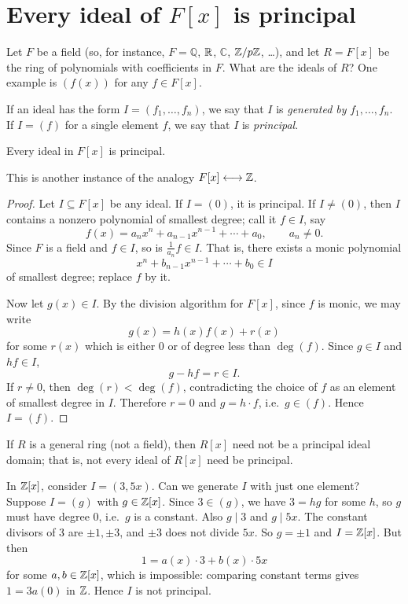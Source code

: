 \documentclass[reqno,11pt]{amsart}
\newcommand{\Q}{\mathbb{Q}}
\newcommand{\C}{\mathbb{C}}
\begin{document}
\section{Every ideal of \texorpdfstring{$F[x]$}{F[x]} is principal}

Let $F$ be a field (so, for instance, $F=\Q$, $\mathbb{R}$, $\C$,
$\mathbb{Z}/p\mathbb{Z}$, \dots), and let $R=F[x]$ be the ring of polynomials with
coefficients in $F$. What are the ideals of $R$? One example is
$(f(x))$ for any $f\in F[x]$.

\begin{define}
If an ideal has the form $I=(f_1,\dots,f_n)$, we say that $I$ is
\emph{generated by} $f_1,\dots,f_n$. If $I=(f)$ for a single element
$f$, we say that $I$ is \emph{principal}.
\end{define}

\begin{theorem}\label{thm:Fx-principal}
Every ideal in $F[x]$ is principal.
\end{theorem}

This is another instance of the analogy $F[x]\longleftrightarrow\mathbb{Z}$.

\begin{proof}
Let $I\subseteq F[x]$ be any ideal. If $I=(0)$, it is principal.
If $I\neq(0)$, then $I$ contains a nonzero polynomial of smallest
degree; call it $f\in I$, say
\[
  f(x)=a_nx^n+a_{n-1}x^{n-1}+\cdots+a_0,\qquad a_n\neq0.
\]
Since $F$ is a field and $f\in I$, so is $\frac1{a_n}f\in I$.
That is, there exists a monic polynomial
\[
  x^n+b_{n-1}x^{n-1}+\cdots+b_0\in I
\]
of smallest degree; replace $f$ by it.

Now let $g(x)\in I$. By the division algorithm for $F[x]$, since $f$
is monic, we may write
\[
  g(x)=h(x)f(x)+r(x)
\]
for some $r(x)$ which is either $0$ or of degree less than
$\deg(f)$. Since $g\in I$ and $hf\in I$,
\[
  g-hf=r\in I.
\]
If $r\neq0$, then $\deg(r)<\deg(f)$, contradicting the choice of $f$
as an element of smallest degree in $I$. Therefore $r=0$ and
$g=h\cdot f$, i.e.\ $g\in(f)$. Hence $I=(f)$.
\end{proof}

\begin{warningbox}
If $R$ is a general ring (not a field), then $R[x]$ need not be a
principal ideal domain; that is, not every ideal of $R[x]$ need be
principal.
\end{warningbox}

\begin{example}
In $\mathbb{Z}[x]$, consider $I=(3,5x)$. Can we generate $I$ with just one
element? Suppose $I=(g)$ with $g\in\mathbb{Z}[x]$. Since $3\in(g)$, we have
$3=hg$ for some $h$, so $g$ must have degree $0$, i.e.\ $g$ is a
constant. Also $g\mid3$ and $g\mid5x$. The constant divisors of $3$
are $\pm1,\pm3$, and $\pm3$ does not divide $5x$. So $g=\pm1$ and
$I=\mathbb{Z}[x]$. But then
\[
  1=a(x)\cdot3+b(x)\cdot5x
\]
for some $a,b\in\mathbb{Z}[x]$, which is impossible: comparing constant
terms gives $1=3a(0)$ in $\mathbb{Z}$.
Hence $I$ is not principal.
\end{example}
\end{document}
